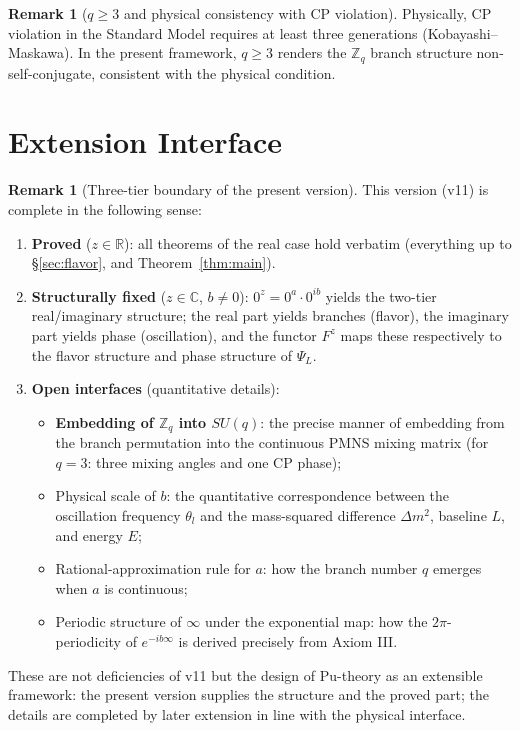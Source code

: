\documentclass[11pt]{article}
\theoremstyle{plain}
\theoremstyle{definition}
\newtheorem{rem}[thm]{Remark}
\begin{document}
\begin{rem}[$q\geq 3$ and physical consistency with CP violation]\label{rem:km}
Physically, CP violation in the Standard Model requires at least three
generations (Kobayashi--Maskawa). In the present framework, $q\geq 3$
renders the $\mathbb{Z}_q$ branch structure non-self-conjugate, consistent
with the physical condition.
\end{rem}

\section{Extension Interface}\label{sec:extension}

\begin{rem}[Three-tier boundary of the present version]\label{rem:boundary}
This version (v11) is complete in the following sense:
\begin{enumerate}
\item \textbf{Proved} ($z\in\mathbb{R}$): all theorems of the real case
hold verbatim (everything up to \S\ref{sec:flavor}, and
Theorem~\ref{thm:main}).
\item \textbf{Structurally fixed} ($z\in\mathbb{C}$, $b\neq 0$):
$0^z = 0^a\cdot 0^{ib}$ yields the two-tier real/imaginary structure; the
real part yields branches (flavor), the imaginary part yields phase
(oscillation), and the functor $F^z$ maps these respectively to the flavor
structure and phase structure of $\Psi_L$.
\item \textbf{Open interfaces} (quantitative details):
  \begin{itemize}
  \item \textbf{Embedding of $\mathbb{Z}_q$ into $SU(q)$}:
  the precise manner of embedding from the branch permutation into the
  continuous PMNS mixing matrix (for $q=3$: three mixing angles and one CP
  phase);
  \item Physical scale of $b$: the quantitative correspondence between the
  oscillation frequency $\theta_l$ and the mass-squared difference
  $\Delta m^2$, baseline $L$, and energy $E$;
  \item Rational-approximation rule for $a$: how the branch number $q$
  emerges when $a$ is continuous;
  \item Periodic structure of $\infty$ under the exponential map: how the
  $2\pi$-periodicity of $e^{-ib\infty}$ is derived precisely from
  Axiom III.
  \end{itemize}
\end{enumerate}
These are not deficiencies of v11 but the design of Pu-theory as an
extensible framework: the present version supplies the structure and the
proved part; the details are completed by later extension in line with the
physical interface.
\end{rem}
\end{document}
